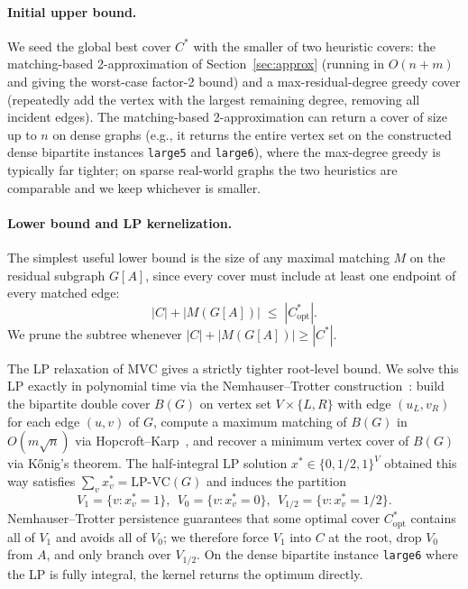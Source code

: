 \documentclass[sigconf]{acmart}
\begin{document}
\paragraph{Initial upper bound.} We seed the global best cover
$C^{\!*}$ with the smaller of two heuristic covers: the
matching-based 2-approximation of Section~\ref{sec:approx}
(running in $O(n + m)$ and giving the worst-case factor-2 bound) and
a max-residual-degree greedy cover (repeatedly add the vertex with
the largest remaining degree, removing all incident edges). The
matching-based 2-approximation can return a cover of size up to $n$
on dense graphs (e.g., it returns the entire vertex set on the
constructed dense bipartite instances \texttt{large5} and
\texttt{large6}), where the max-degree greedy is typically far
tighter; on sparse real-world graphs the two heuristics are
comparable and we keep whichever is smaller.

\paragraph{Lower bound and LP kernelization.} The simplest useful
lower bound is the size of any maximal matching $M$ on the residual
subgraph $G[A]$, since every cover must include at least one endpoint
of every matched edge:
\[
  |C| + |M(G[A])| \;\le\; |C^*_{\text{opt}}|.
\]
We prune the subtree whenever $|C| + |M(G[A])| \ge |C^{\!*}|$.

The LP relaxation of MVC gives a strictly tighter root-level bound.
We solve this LP exactly in polynomial time via the Nemhauser--Trotter
construction~\cite{nemhauser1975vertex,hochbaum1982approximation}:
build the bipartite double cover $B(G)$ on vertex set
$V \times \{L, R\}$ with edge $(u_L, v_R)$ for each edge $(u, v)$ of
$G$, compute a maximum matching of $B(G)$ in $O(m\sqrt{n})$ via
Hopcroft--Karp~\cite{hopcroft1973n52}, and recover a minimum vertex
cover of $B(G)$ via K\H{o}nig's theorem. The half-integral LP solution
$x^* \in \{0, 1/2, 1\}^V$ obtained this way satisfies
$\sum_v x^*_v = \mathrm{LP\text{-}VC}(G)$ and induces the partition
\[
  V_1 = \{v : x^*_v = 1\},\ \
  V_0 = \{v : x^*_v = 0\},\ \
  V_{1/2} = \{v : x^*_v = 1/2\}.
\]
Nemhauser--Trotter persistence guarantees that some optimal cover
$C^*_{\text{opt}}$ contains all of $V_1$ and avoids all of $V_0$;
we therefore force $V_1$ into $C$ at the root, drop $V_0$ from $A$,
and only branch over $V_{1/2}$. On the dense bipartite instance
\texttt{large6} where the LP is fully integral, the kernel returns
the optimum directly.
\end{document}
